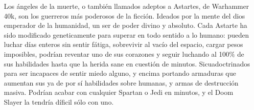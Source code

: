 \documentclass[12pt,letterpaper]{article}
\begin{document}
{\color{red} Los ángeles de la muerte, o también llamados adeptos a Astartes, de Warhammer 40k, son los guerreros más poderosos de la ficción. Ideados por la mente del dios emperador de la humanidad, un ser de poder divino y absoluto. Cada Astarte ha sido modificado geneticamente para superar en todo sentido a lo humano: pueden luchar días enteros sin sentir fátiga, sobrevivir al vacío del espacio, cargar pesos imposibles, podrían reventar uno de sus corazones y seguir luchando al 100\% de sus habilidades hasta que la herida sane en cuestión de minutos.} {\color{blue}Sicuadoctrinados para ser incapaces de sentir miedo alguno, y encima portando armaduras que aumentan sus ya de por sí habilidades sobre humanas, y armas de destrucción masiva. Podrían acabar con cualquier Spartan o Jedi en minutos, y el Doom Slayer la tendría díficil sólo con uno.}
\end{document}
